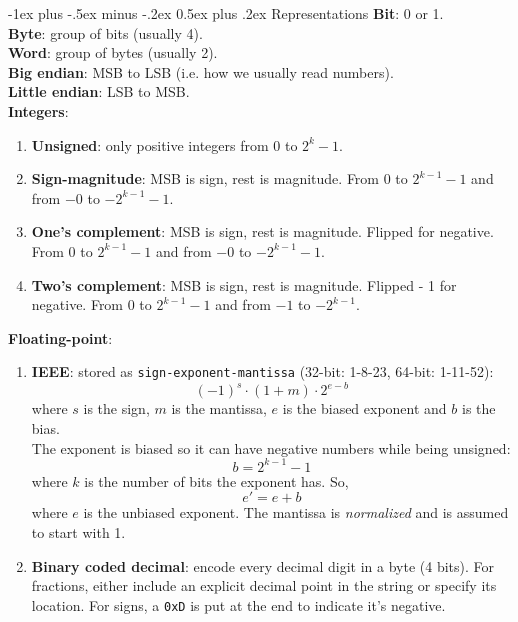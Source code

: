 \documentclass[10pt,landscape]{article}
\makeatletter
\renewcommand{\section}{\@startsection{section}{1}{0mm}%
                                {-1ex plus -.5ex minus -.2ex}%
                                {0.5ex plus .2ex}%
                                {\normalfont\large\bfseries}}
\makeatother
\begin{document}
\begin{multicols}{3}
\section{Representations}
\textbf{Bit}: 0 or 1.\\
\textbf{Byte}: group of bits (usually 4).\\
\textbf{Word}: group of bytes (usually 2).\\
\textbf{Big endian}: MSB to LSB (i.e. how we usually read numbers).\\
\textbf{Little endian}: LSB to MSB.\\
\textbf{Integers}:
\begin{enumerate}
\item \textbf{Unsigned}: only positive integers from $0$ to $2^k-1$.
\item \textbf{Sign-magnitude}: MSB is sign, rest is magnitude. From $0$ to $2^{k-1}-1$ and from $-0$ to $-2^{k-1}-1$.
\item \textbf{One's complement}: MSB is sign, rest is magnitude. Flipped for negative. From $0$ to $2^{k-1}-1$ and from $-0$ to $-2^{k-1}-1$.
\item \textbf{Two's complement}: MSB is sign, rest is magnitude. Flipped - 1 for negative. From $0$ to $2^{k-1}-1$ and from $-1$ to $-2^{k-1}$.
\end{enumerate}
\textbf{Floating-point}: 
\begin{enumerate}
\item \textbf{IEEE}: stored as \texttt{sign-exponent-mantissa} (32-bit: 1-8-23, 64-bit: 1-11-52):
$$(-1)^s\cdot(1+m)\cdot 2^{e-b}$$
where $s$ is the sign, $m$ is the mantissa, $e$ is the biased exponent and $b$ is the bias. \\
The exponent is biased so it can have negative numbers while being unsigned:
$$b=2^{k-1}-1$$
where $k$ is the number of bits the exponent has. So,
$$e'=e+b$$
where $e$ is the unbiased exponent. The mantissa is \textit{normalized} and is assumed to start with 1.
\item \textbf{Binary coded decimal}: encode every decimal digit in a byte (4 bits). For fractions, either include an explicit decimal point in the string or specify its location. For signs, a \texttt{0xD} is put at the end to indicate it's negative. 
\end{enumerate}

\end{multicols}
\end{document}
